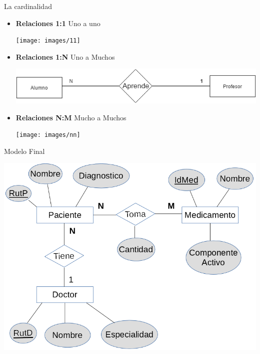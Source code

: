 \documentclass[11pt]{beamer}
\begin{document}
\begin{frame}{La cardinalidad}

\begin{itemize}

\item \textbf{Relaciones 1:1}  Uno a uno

\begin{center}
\texttt{[image: images/11]} 
\end{center}



\item \textbf{Relaciones 1:N} Uno a Muchos

\begin{center}
\includegraphics[scale=.47]{images/1n} 
\end{center}


\item \textbf{Relaciones N:M} Mucho a Muchos

\begin{center}
\texttt{[image: images/nn]} 
\end{center}



\end{itemize}
\end{frame}


\begin{frame}{Modelo Final}
\begin{center}
\includegraphics[scale=.47]{images/6} 
\end{center}
\end{frame}
\end{document}
